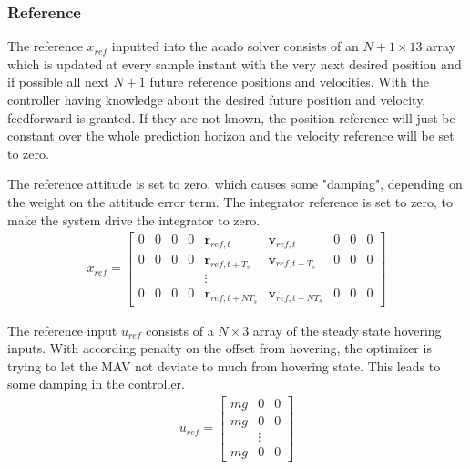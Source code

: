 \subsubsection{Reference}
The reference $x_{ref}$ inputted into the acado solver consists of an $N+1\times13$ array which is updated at every sample instant with the very next desired position and if possible all next $N+1$ future reference positions and velocities. With the controller having knowledge about the desired future position and velocity, feedforward is granted. If they are not known, the position reference will just be constant over the whole prediction horizon and the velocity reference will be set to zero. 

The reference attitude is set to zero, which causes some "damping", depending on the weight on the attitude error term. The integrator reference is set to zero, to make the system drive the integrator to zero.
\begin{align}
x_{ref} = \begin{bmatrix}
0 & 0 & 0 & 0 & \mathbf{r}_{ref,t} & \mathbf{v}_{ref,t} & 0 & 0 & 0 \\
0 & 0 & 0 & 0 & \mathbf{r}_{ref,t+T_s} & \mathbf{v}_{ref,t+T_s} & 0 & 0 & 0 \\
 &  &  &  & \vdots &  &  &  &  \\
0 & 0 & 0 & 0 & \mathbf{r}_{ref,t+NT_s} & \mathbf{v}_{ref,t+NT_s} & 0 & 0 & 0 
\end{bmatrix}
\end{align}

The reference input $u_{ref}$ consists of a $N\times3$ array of the steady state hovering inputs. With according penalty on the offset from hovering, the optimizer is trying to let the MAV not deviate to much from hovering state. This leads to some damping in the controller.
\begin{align}
u_{ref} = \begin{bmatrix}
mg & 0 & 0 \\
mg & 0 & 0 \\
  & \vdots &  \\
mg & 0 & 0 
\end{bmatrix}
\end{align}
